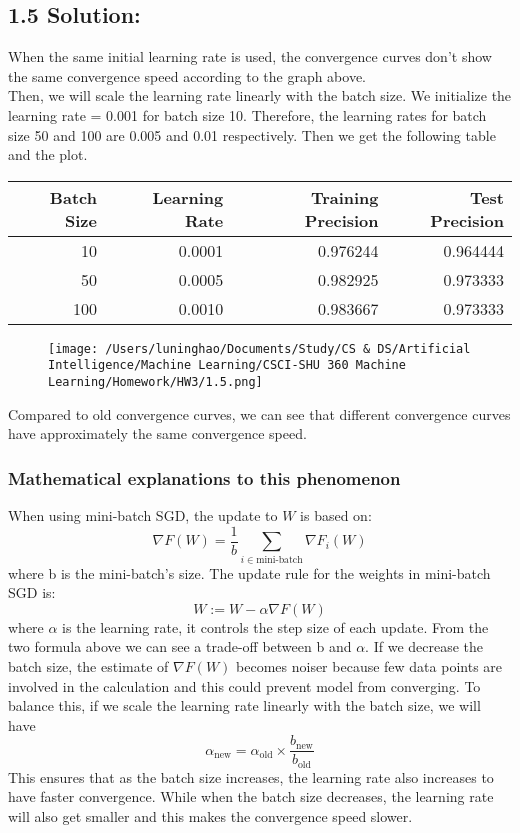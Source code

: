 \documentclass{article}
\begin{document}
\subsection*{1.5 Solution:}
When the same initial learning rate is used, the convergence curves don't show the same convergence speed according to the graph above. \\
Then, we will scale the learning rate linearly with the batch size. We initialize the learning rate = 0.001 for batch size 10. Therefore, the learning rates for batch size 50 and 100 are 0.005 and 0.01 respectively. Then we get the following table and the plot.
\begin{center}
    \begin{tabular}{rrrr}
    \toprule
     Batch Size &  Learning Rate &  Training Precision &  Test Precision \\
    \midrule
             10 &         0.0001 &            0.976244 &        0.964444 \\
             50 &         0.0005 &            0.982925 &        0.973333 \\
            100 &         0.0010 &            0.983667 &        0.973333 \\
    \bottomrule
    \end{tabular}
    \end{center}
\begin{figure}[h]
    \centering
    \texttt{[image: /Users/luninghao/Documents/Study/CS \& DS/Artificial Intelligence/Machine Learning/CSCI-SHU 360 Machine Learning/Homework/HW3/1.5.png]}
\end{figure}
Compared to old convergence curves, we can see that different convergence curves have approximately the same convergence speed.
\subsubsection*{Mathematical explanations to this phenomenon}
When using mini-batch SGD, the update to \( W \) is based on:
\[
\nabla F(W) = \frac{1}{b} \sum_{i \in \text{mini-batch}} \nabla F_i(W)
\]
where b is the mini-batch's size. The update rule for the weights in mini-batch SGD is:
\[
W := W - \alpha \nabla F(W)
\]
where $\alpha$ is the learning rate, it controls the step size of each update. From the two formula above we can see a trade-off between b and $\alpha$. If we decrease the batch size, the estimate of \( \nabla F(W) \) becomes noiser because few data points are involved in the calculation and this could prevent model from converging. 
To balance this, if we scale the learning rate linearly with the batch size, we will have
\[
\alpha_{\text{new}} = \alpha_{\text{old}} \times \frac{b_{\text{new}}}{b_{\text{old}}}
\]
This ensures that as the batch size increases, the learning rate also increases to have faster convergence. While when the batch size decreases, the learning rate will also get smaller and this makes the convergence speed slower.
\end{document}
